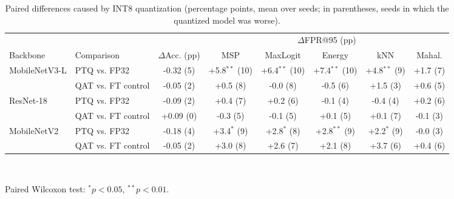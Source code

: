 \begin{table}[t]
\centering
\caption{Paired differences caused by INT8 quantization (percentage points, mean over seeds; in parentheses, seeds in which the quantized model was worse).}
\label{tab:paired}
\setlength{\tabcolsep}{3pt}
\footnotesize
\begin{tabular}{llcccccc}
\toprule
 & & & \multicolumn{5}{c}{$\Delta$FPR@95 (pp)} \\
\cmidrule(lr){4-8}
Backbone & Comparison & $\Delta$Acc. (pp) & MSP & MaxLogit & Energy & kNN & Mahal. \\
\midrule
MobileNetV3-L & PTQ vs. FP32 & -0.32 (5) & +5.8$^{**}$ (10) & +6.4$^{**}$ (10) & +7.4$^{**}$ (10) & +4.8$^{**}$ (9) & +1.7 (7) \\
 & QAT vs. FT control & -0.05 (2) & +0.5 (8) & -0.0 (8) & -0.5 (6) & +1.5 (3) & +0.6 (5) \\
\midrule
ResNet-18 & PTQ vs. FP32 & -0.09 (2) & +0.4 (7) & +0.2 (6) & -0.1 (4) & -0.4 (4) & +0.2 (6) \\
 & QAT vs. FT control & +0.09 (0) & -0.3 (5) & -0.1 (5) & +0.1 (5) & +0.1 (7) & -0.1 (3) \\
\midrule
MobileNetV2 & PTQ vs. FP32 & -0.18 (4) & +3.4$^{*}$ (9) & +2.8$^{*}$ (8) & +2.8$^{**}$ (9) & +2.2$^{*}$ (9) & -0.0 (3) \\
 & QAT vs. FT control & -0.05 (2) & +3.0 (8) & +2.6 (7) & +2.1 (8) & +3.7 (6) & +0.4 (6) \\
\bottomrule
\end{tabular}
\\[2pt]\parbox{\linewidth}{\scriptsize Paired Wilcoxon test: $^{*}p<0.05$, $^{**}p<0.01$.}
\end{table}